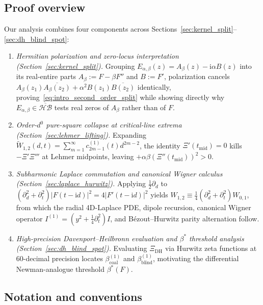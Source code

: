 \documentclass[11pt,reqno]{amsart}
\theoremstyle{definition}
\theoremstyle{remark}
\numberwithin{equation}{section}
\newcommand{\ii}{\mathrm{i}}
\begin{document}
\subsection{Proof overview}\label{subsec:proof_overview}

Our analysis combines four components across Sections~\ref{sec:kernel_split}--\ref{sec:dh_blind_spot}:
\begin{enumerate}[label=\textup{(\arabic*)},leftmargin=2.2em]
\item \textit{Hermitian polarization and zero-locus interpretation (Section~\ref{sec:kernel_split}).} Grouping $E_{\alpha,\beta}(z) = A_\beta(z) - \ii\alpha B(z)$ into its real-entire parts $A_\beta := F - \beta F''$ and $B := F'$, polarization cancels $A_\beta(z_1)\overline{A_\beta(z_2)} + \alpha^2 B(z_1)\overline{B(z_2)}$ identically, proving~\eqref{eq:intro_second_order_split} while showing directly why $E_{\alpha,\beta} \in \overline{\mathcal{HB}}$ tests real zeros of $A_\beta$ rather than of $F$.
\item \textit{Order-$d^0$ pure-square collapse at critical-line extrema (Section~\ref{sec:lehmer_lifting}).} Expanding $\widetilde{W}_{1,2}(d,t) = \sum_{m=1}^\infty c_{2m-1}^{(1)}(t)d^{2m-2}$, the identity $\Xi'(t_{\mathrm{mid}}) = 0$ kills $-\Xi'\Xi'''$ at Lehmer midpoints, leaving $+\alpha\beta(\Xi''(t_{\mathrm{mid}}))^2 > 0$.
\item \textit{Subharmonic Laplace commutation and canonical Wigner calculus (Section~\ref{sec:laplace_hurwitz}).} Applying $\frac{1}{2}\partial_d$ to $(\partial_d^2 + \partial_t^2)|F(t-\ii d)|^2 = 4|F'(t-\ii d)|^2$ yields $W_{1,2} \equiv \frac{1}{4}(\partial_d^2 + \partial_t^2)W_{0,1}$, from which the radial 4D-Laplace PDE, dipole recursion, canonical Wigner operator $I^{(1)} = (y^2 + \frac{1}{4}\partial_t^2)I$, and Bézout--Hurwitz parity alternation follow.
\item \textit{High-precision Davenport--Heilbronn evaluation and $\beta^*$ threshold analysis (Section~\ref{sec:dh_blind_spot}).} Evaluating $\Xi_{\mathrm{DH}}$ via Hurwitz zeta functions at $60$-decimal precision locates $\beta_{\mathrm{coal}}^{(1)}$ and $\beta_{\mathrm{blind}}^{(1)}$, motivating the differential Newman-analogue threshold $\beta^*(F)$.
\end{enumerate}

\subsection{Notation and conventions}\label{subsec:notation}
\end{document}
